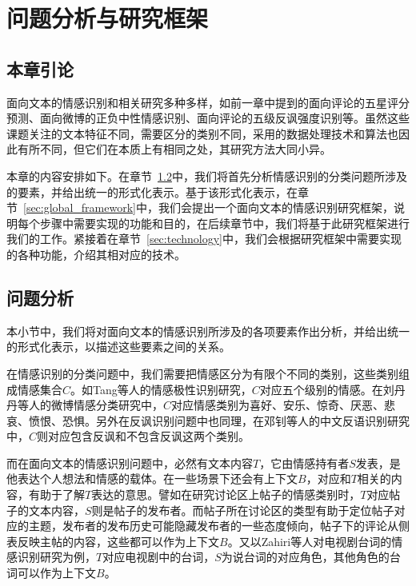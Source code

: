 \chapter{问题分析与研究框架}
\label{cha:problem_framework}

\section{本章引论}

面向文本的情感识别和相关研究多种多样，如前一章中提到的面向评论的五星评分预测、面向微博的正负中性情感识别、面向评论的五级反讽强度识别等。虽然这些课题关注的文本特征不同，需要区分的类别不同，采用的数据处理技术和算法也因此有所不同，但它们在本质上有相同之处，其研究方法大同小异。

本章的内容安排如下。在章节~\ref{sec:global_problem_analysis}中，我们将首先分析情感识别的分类问题所涉及的要素，并给出统一的形式化表示。基于该形式化表示，在章节~\ref{sec:global_framework}中，我们会提出一个面向文本的情感识别研究框架，说明每个步骤中需要实现的功能和目的，在后续章节中，我们将基于此研究框架进行我们的工作。紧接着在章节~\ref{sec:technology}中，我们会根据研究框架中需要实现的各种功能，介绍其相对应的技术。

\section{问题分析}
\label{sec:global_problem_analysis}

本小节中，我们将对面向文本的情感识别所涉及的各项要素作出分析，并给出统一的形式化表示，以描述这些要素之间的关系。

在情感识别的分类问题中，我们需要把情感区分为有限个不同的类别，这些类别组成情感集合$C$。如Tang等人\cite{tang2015learning}的情感极性识别研究，$C$对应五个级别的情感。在刘丹丹等人\cite{刘丹丹2015基于}的微博情感分类研究中，$C$对应情感类别为喜好、安乐、惊奇、厌恶、悲哀、愤恨、恐惧。另外在反讽识别问题中也同理，在邓钊等人\cite{2015面向微博的中文反语识别研究}的中文反语识别研究中，$C$则对应包含反讽和不包含反讽这两个类别。

而在面向文本的情感识别问题中，必然有文本内容$T$，它由情感持有者$S$发表，是他表达个人想法和情感的载体。在一些场景下还会有上下文$B$，对应和$T$相关的内容，有助于了解$T$表达的意思。譬如在研究讨论区上帖子的情感类别时，$T$对应帖子的文本内容，$S$则是帖子的发布者。而帖子所在讨论区的类型有助于定位帖子对应的主题，发布者的发布历史可能隐藏发布者的一些态度倾向，帖子下的评论从侧表反映主帖的内容，这些都可以作为上下文$B$。又以Zahiri等人\cite{Zahiri2017Emotion}对电视剧台词的情感识别研究为例，$T$对应电视剧中的台词，$S$为说台词的对应角色，其他角色的台词可以作为上下文$B$。

